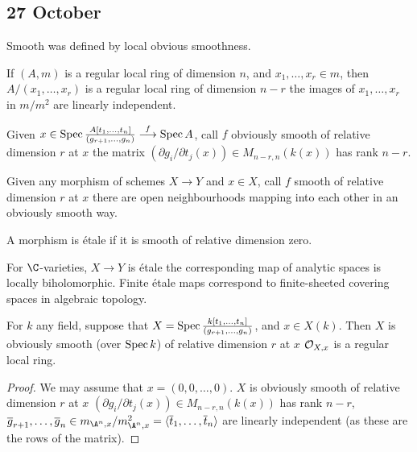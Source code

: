 \documentclass[11pt]{article}
\begin{document}
\begin{Oct27}
\section*{27 October}
Smooth was defined by local obvious smoothness.
\begin{fact*}
If $(A,m)$ is a regular local ring of dimension $n$, and $x_1,\ldots, x_r\in m$, then $A/(x_1,\ldots,x_r)$ is a regular local ring of dimension $n-r$ \Iff the images of $x_1,\ldots,x_r$ in $m/m^2$ are linearly independent.
\end{fact*}
\begin{defn*}
Given $x\in\operatorname{Spec}\frac{ A[t_1,\ldots,t_n]}{(g_{r+1},\ldots,g_n)}\overset{f}{\longrightarrow} \operatorname{Spec} A$, call $f$ obviously smooth of relative dimension $r$ at $x$ \Iff the matrix $(\partial g_i/\partial t_j(x))\in M_{n-r,n}(k(x))$ has rank $n-r$.
\end{defn*}
\begin{defn*}
Given any morphism of schemes $X\to Y$ and $x\in X$, call $f$ smooth of relative dimension $r$ at $x$ \Iff there are open neighbourhoods mapping into  each other in an obviously smooth way.
\end{defn*}
\begin{defn*}
A morphism is \'etale if it is smooth of relative dimension zero.
\end{defn*}
\noindent For $\C$-varieties, $X\to Y$ is \'etale \Iff the corresponding map of analytic spaces is locally biholomorphic. Finite \'etale maps correspond to finite-sheeted covering spaces in algebraic topology.

\begin{prop*}
For $k$ any field, suppose that $X=\operatorname{Spec} \frac{k[t_1,\ldots,t_n]}{(g_{r+1},\ldots,g_n)}$, and $x\in X(k)$. Then $X$ is obviously smooth (over $\operatorname{Spec} k$) of relative dimension $r$ at $x$ \Iff $\mathcal{O}_{X,x}$ is a regular local ring.
\end{prop*}
\begin{proof}
We may assume that $x=(0,0,\ldots,0)$. $X$ is obviously smooth of relative dimension $r$ at $x$ \Iff $(\partial g_i/\partial t_j(x))\in M_{n-r,n}(k(x))$ has rank $n-r$, \Iff $\overline g_{r+1},\ldots,\overline g_n\in m_{\A^n,x}/m_{\A^n,x}^2=\langle \overline t_1,\ldots,\overline t_n\rangle $ are linearly independent (as these are the rows of the matrix).


\end{proof}
\end{Oct27}
\end{document}
